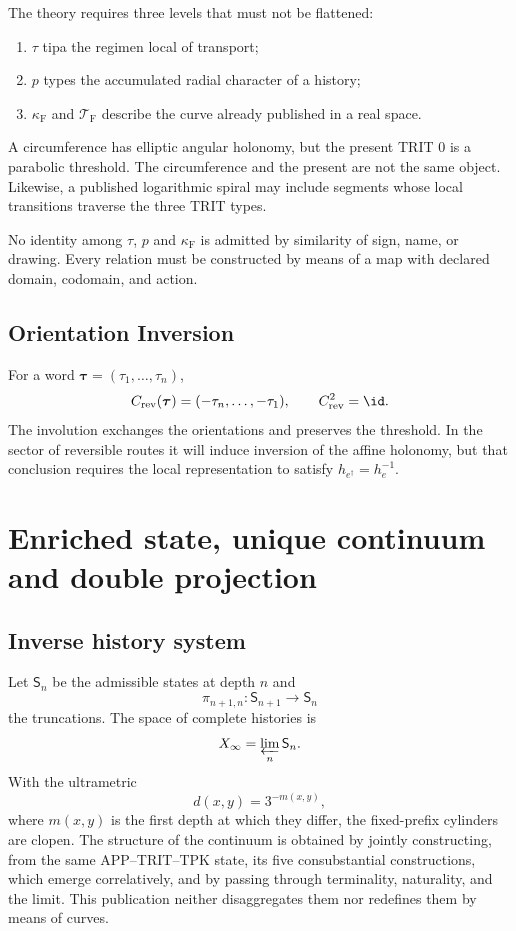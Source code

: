 The theory requires three levels that must not be flattened:
\begin{enumerate}
\item \(\tau\) tipa the regimen local of transport;
\item \(p\) types the accumulated radial character of a history;
\item \(\kappa_{\mathrm{F}}\) and \(\mathcal T_{\mathrm{F}}\) describe the curve already
published in a real space.
\end{enumerate}
A circumference has elliptic angular holonomy, but the present TRIT
\(0\) is a parabolic threshold. The circumference and the present are not the
same object. Likewise, a published logarithmic spiral may include
segments whose local transitions traverse the three TRIT types.

\begin{principle}
No identity among \(\tau\), \(p\) and \(\kappa_{\mathrm{F}}\) is admitted by
similarity of sign, name, or drawing. Every relation must be constructed by means of
a map with declared domain, codomain, and action.
\end{principle}

\section{Orientation Inversion}

For a word \(\boldsymbol\tau=(\tau_1,\ldots,\tau_n)\),
\[
 C_{\mathrm{rev}}(\boldsymbol\tau)
 =(-\tau_n,\ldots,-\tau_1),
 \qquad C_{\mathrm{rev}}^2=\id.
\]
The involution exchanges the orientations and preserves the threshold. In the
sector of reversible routes it will induce inversion of the affine holonomy, but
that conclusion requires the local representation to satisfy
\(h_{e^\dagger}=h_e^{-1}\).

\chapter{Enriched state, unique continuum and double projection}

\section{Inverse history system}

Let \(\mathsf S_n\) be the admissible states at depth \(n\) and
\[
 \pi_{n+1,n}:\mathsf S_{n+1}\longrightarrow\mathsf S_n
\]
the truncations. The space of complete histories is
\[
 X_\infty=\varprojlim_n\mathsf S_n.
\]
With the ultrametric
\[
 d(x,y)=3^{-m(x,y)},
\]
where \(m(x,y)\) is the first depth at which they differ, the fixed-prefix
cylinders are clopen. The structure of the continuum is obtained by jointly
constructing, from the same APP--TRIT--TPK state, its five consubstantial
constructions, which emerge correlatively, and by passing through terminality,
naturality, and the limit. This publication neither disaggregates them nor
redefines them by means of curves.

